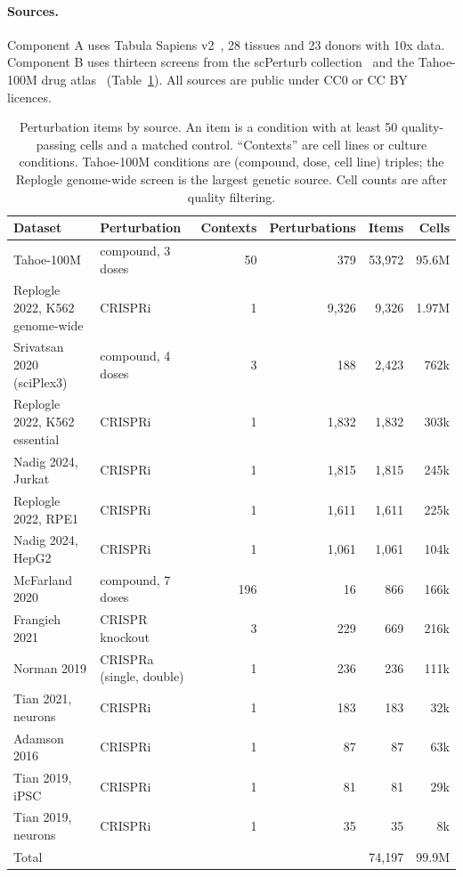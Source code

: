 \documentclass[11pt]{article}
\begin{document}
\paragraph{Sources.}
Component A uses Tabula Sapiens v2~\cite{tabulasapiens2}, 28 tissues and 23 donors with 10x data. Component B
uses thirteen screens from the scPerturb collection~\cite{scperturb} and the Tahoe-100M drug atlas~\cite{tahoe}
(Table~\ref{tab:compB}). All sources are public under CC0 or CC BY licences.

\begin{table}[t]
\centering
\small
\caption{Perturbation items by source. An item is a condition with at least 50
quality-passing cells and a matched control. ``Contexts'' are cell lines or culture
conditions. Tahoe-100M conditions are (compound, dose, cell line) triples; the Replogle
genome-wide screen is the largest genetic source. Cell counts are after quality filtering.}
\label{tab:compB}
\footnotesize
\begin{tabular}{@{}llrrrr@{}}
\toprule
Dataset & Perturbation & Contexts & Perturbations & Items & Cells \\
\midrule
Tahoe-100M & compound, 3 doses & 50 & 379 & 53,972 & 95.6M \\
Replogle 2022, K562 genome-wide & CRISPRi & 1 & 9,326 & 9,326 & 1.97M \\
Srivatsan 2020 (sciPlex3) & compound, 4 doses & 3 & 188 & 2,423 & 762k \\
Replogle 2022, K562 essential & CRISPRi & 1 & 1,832 & 1,832 & 303k \\
Nadig 2024, Jurkat & CRISPRi & 1 & 1,815 & 1,815 & 245k \\
Replogle 2022, RPE1 & CRISPRi & 1 & 1,611 & 1,611 & 225k \\
Nadig 2024, HepG2 & CRISPRi & 1 & 1,061 & 1,061 & 104k \\
McFarland 2020 & compound, 7 doses & 196 & 16 & 866 & 166k \\
Frangieh 2021 & CRISPR knockout & 3 & 229 & 669 & 216k \\
Norman 2019 & CRISPRa (single, double) & 1 & 236 & 236 & 111k \\
Tian 2021, neurons & CRISPRi & 1 & 183 & 183 & 32k \\
Adamson 2016 & CRISPRi & 1 & 87 & 87 & 63k \\
Tian 2019, iPSC & CRISPRi & 1 & 81 & 81 & 29k \\
Tian 2019, neurons & CRISPRi & 1 & 35 & 35 & 8k \\
\midrule
Total & & & & 74,197 & 99.9M \\
\bottomrule
\end{tabular}
\end{table}
\end{document}
